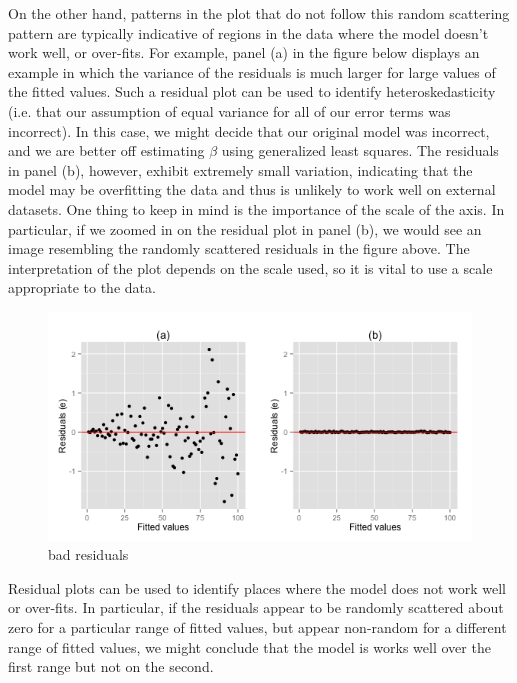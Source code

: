On the other hand, patterns in the plot that do not follow this random scattering pattern are typically indicative of regions in the data where the model doesn't work well, or over-fits. For example, panel (a) in the figure below displays an example in which the variance of the residuals is much larger for large values of the fitted values. Such a residual plot can be used to identify heteroskedasticity (i.e. that our assumption of equal variance for all of our error terms was incorrect). In this case, we might decide that our original model was incorrect, and we are better off estimating $\beta$ using generalized least squares. The residuals in panel (b), however, exhibit extremely small variation, indicating that the model may be overfitting the data and thus is unlikely to work well on external datasets. One thing to keep in mind is the importance of the scale of the axis. In particular, if we zoomed in on the residual plot in panel (b), we would see an image resembling the randomly scattered residuals in the figure above. The interpretation of the plot depends on the scale used, so it is vital to use a scale appropriate to the data.


\begin{figure}[H]
\begin{center}
\includegraphics[scale=0.4]{badresiduals.png}
\end{center}
\caption{bad residuals}
\label{fig:badresiduals}
\end{figure}

Residual plots can be used to identify places where the model does not work well or over-fits. In particular, if the residuals appear to be randomly scattered about zero for a particular range of fitted values, but appear non-random for a different range of fitted values, we might conclude that the model is works well over the first range but not on the second.



